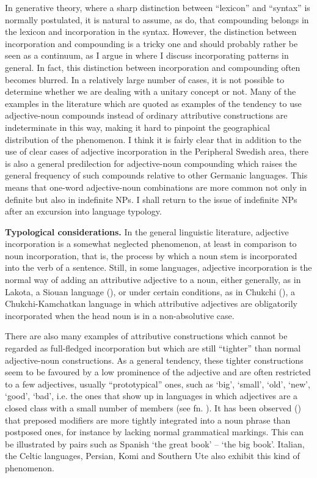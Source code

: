 In generative theory, where a sharp distinction between “lexicon” and “syntax” is normally postulated, it is natural to assume, as \citet{SandströmEtAl2003} do, that compounding belongs in the lexicon and incorporation in the syntax. However, the distinction between incorporation and compounding is a tricky one and should probably rather be seen as a continuum, as I argue in \citet[Ch.10]{Dahl2004} where I discuss incorporating patterns in general. In fact, this distinction between incorporation and compounding often becomes blurred. In a relatively large number of cases, it is not possible to determine whether we are dealing with a unitary concept or not. Many of the examples in the literature which are quoted as examples of the tendency to use adjective-noun compounds instead of ordinary attributive constructions are indeterminate in this way, making it hard to pinpoint the geographical distribution of the phenomenon. I think it is fairly clear that in addition to the use of clear cases of adjective incorporation in the Peripheral Swedish area, there is also a general predilection for adjective-noun compounding which raises the general frequency of such compounds relative to other Germanic languages. This means that one-word adjective-noun combinations are more common not only in definite but also in indefinite NPs. I shall return to the issue of indefinite NPs after an excursion into language typology.

\textbf{Typological considerations.} In the general linguistic literature, adjective incorporation is a somewhat neglected phenomenon, at least in comparison to noun incorporation, that is, the process by which a noun stem is incorporated into the verb of a sentence. Still, in some languages, adjective incorporation is the normal way of adding an attributive adjective to a noun, either generally, as in Lakota, a Siouan language (\citet{BoasEtAl1941}), or under certain conditions, as in Chukchi (\citet[526]{Muravyova1998}), a Chukchi-Kamchatkan language in which attributive adjectives are obligatorily incorporated when the head noun is in a non-absolutive case.

There are also many examples of attributive constructions which cannot be regarded as full-fledged incorporation but which are still “tighter” than normal adjective-noun constructions. As a general tendency, these tighter constructions seem to be favoured by a low prominence of the adjective and are often restricted to a few adjectives, usually “prototypical” ones, such as ‘big’, ‘small’, ‘old’, ‘new’, ‘good’, ‘bad’, i.e. the ones that show up in languages in which adjectives are a closed class with a small number of members (see fn. ). It has been observed (\citet{CroftEtAl2001}) that preposed modifiers are more tightly integrated into a noun phrase than postposed ones, for instance by lacking normal grammatical markings. This can be illustrated by pairs such as Spanish ‘the great book’ –  ‘the big book’. Italian, the Celtic languages, Persian, Komi and Southern Ute also exhibit this kind of phenomenon. 

